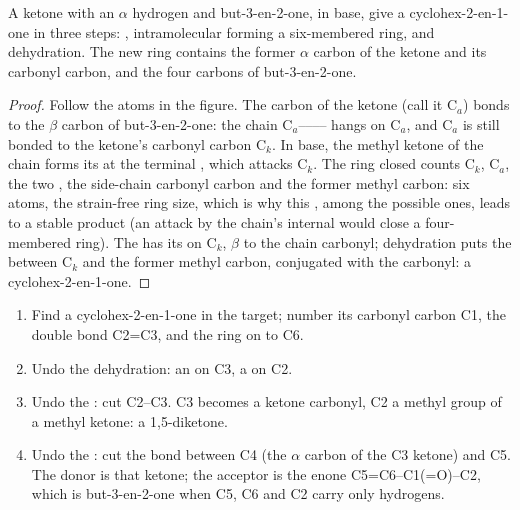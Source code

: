 \begin{proposition}\label{prop:b2:conjugate-additions:robinson}
A ketone with an $\alpha$ hydrogen and but-3-en-2-one, in base, give a cyclohex-2-en-1-one in three
steps: , intramolecular  forming a six-membered ring, and dehydration.
The new ring contains the former $\alpha$ carbon of the ketone and its carbonyl carbon, and the four
carbons of but-3-en-2-one.
\end{proposition}

\begin{proof}
Follow the atoms in the figure. The  carbon of the ketone (call it C$_a$) bonds to the $\beta$
carbon of but-3-en-2-one: the chain C$_a$-------- hangs on C$_a$, and
C$_a$ is still bonded to the ketone's carbonyl carbon C$_k$. In base, the methyl ketone of the chain
forms its  at the terminal , which attacks C$_k$. The ring closed counts C$_k$, C$_a$,
the two , the side-chain carbonyl carbon and the former methyl carbon: six atoms, the strain-free
ring size, which is why this , among the possible ones, leads to a stable product (an
attack by the chain's internal   would close a four-membered ring). The  has its
 on C$_k$, $\beta$ to the chain carbonyl; dehydration puts the  between C$_k$ and the
former methyl carbon, conjugated with the carbonyl: a cyclohex-2-en-1-one.
\end{proof}

\begin{method}\label{met:b2:conjugate-additions:robinson-disconnection}
\begin{enumerate}
  \item Find a cyclohex-2-en-1-one in the target; number its carbonyl carbon C1, the double bond
        C2=C3, and the ring on to C6.
  \item Undo the dehydration: an  on C3, a  on C2.
  \item Undo the : cut C2--C3. C3 becomes a ketone carbonyl, C2 a methyl group of a methyl
        ketone: a 1,5-diketone.
  \item Undo the : cut the bond between C4 (the $\alpha$ carbon of the C3 ketone) and
        C5. The donor is that ketone; the acceptor is the enone C5=C6--C1(=O)--C2, which is
        but-3-en-2-one when C5, C6 and C2 carry only hydrogens.
\end{enumerate}
\end{method}

